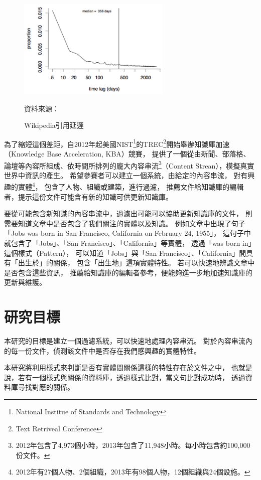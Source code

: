 \begin{figure}[h]
    \centering
    \includegraphics[width=0.65\textwidth]{images/01-wiki-cite-delay}
    \caption{Wikipedia引用延遲}
    資料來源：\cite{kba2012}
    \label{i:wikicitenews}
\end{figure}

為了縮短這個差距，自2012年起美國NIST\footnote{National Institue of Standards and Technology}的TREC\footnote{Text Retriveal Conference}開始舉辦知識庫加速（Knowledge Base Acceleration, KBA）競賽，
提供了一個從由新聞、部落格、論壇等內容所組成、依時間所排列的龐大內容串流\footnote{2012年包含了4,973個小時，2013年包含了11,948小時。\citep{kba2013}每小時包含約100,000份文件。}（Content Strean），模擬真實世界中資訊的產生。
希望參賽者可以建立一個系統，由給定的內容串流，
對有興趣的實體\footnote{2012年有27個人物、2個組織，2013年有98個人物，12個組織與24個設施。}，
包含了人物、組織或建築，進行過濾，
推薦文件給知識庫的編輯者，提示這份文件可能含有新的知識可供更新知識庫。

要從可能包含新知識的內容串流中，過濾出可能可以協助更新知識庫的文件，
則需要知道文章中是否包含了我們關注的實體以及知識。
例如文章中出現了句子「Jobs was born in San Francisco, California on February 24, 1955」，
這句子中就包含了「Jobs」、「San Francisco」、「California」等實體，
透過「was born in」這個樣式（Pattern），
可以知道「Jobs」與「San Francisco」、「California」間具有「出生於」的關係，
包含「出生地」這項實體特性。
若可以快速地辨識文章中是否包含這些資訊，
推薦給知識庫的編輯者參考，便能夠進一步地加速知識庫的更新與維護。

%
%
\section{研究目標}
本研究的目標是建立一個過濾系統，可以快速地處理內容串流。
對於內容串流內的每一份文件，偵測該文件中是否存在我們感興趣的實體特性。

本研究將利用樣式來判斷是否有實體間關係這樣的特性存在於文件之中，
也就是說，若有一個樣式與關係的資料庫，透過樣式比對，當文句比對成功時，
透過資料庫尋找對應的關係。

